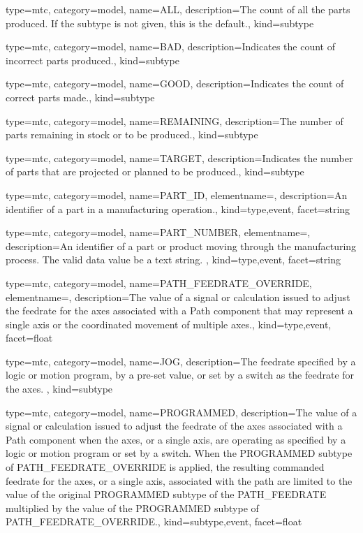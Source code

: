 {
  type=mtc,
  category=model,
  name={ALL},
  description={The count of all the parts produced.  If the subtype is not given, this is the default.},
  kind={subtype}
}


{
  type=mtc,
  category=model,
  name={BAD},
  description={Indicates the count of incorrect parts produced.},
  kind={subtype}
}


{
  type=mtc,
  category=model,
  name={GOOD},
  description={Indicates the count of correct parts made.},
  kind={subtype}
}


{
  type=mtc,
  category=model,
  name={REMAINING},
  description={The number of parts remaining in stock or to be produced.},
  kind={subtype}
}


{
  type=mtc,
  category=model,
  name={TARGET},
  description={Indicates the number of parts that are projected or planned to be produced.},
  kind={subtype}
}


{
  type=mtc,
  category=model,
  name={PART\_ID},
  elementname=,
  description={An identifier of a part in a manufacturing operation.},
  kind={type,event},
  facet={\gls{string}}
}


{
  type=mtc,
  category=model,
  name={PART\_NUMBER},
  elementname=,
  description={An identifier of a part or product moving through the manufacturing process.  The \gls{valid data value} \must be a text string. },
  kind={type,event},
  facet={\gls{string}}
}


{
  type=mtc,
  category=model,
  name={PATH\_FEEDRATE\_OVERRIDE},
  elementname=,
  description={The value of a signal or calculation issued to adjust the feedrate for the axes associated with a Path component that may represent a single axis or the coordinated movement of multiple axes.},
  kind={type,event},
  facet={\gls{float}}
}


{
  type=mtc,
  category=model,
  name={JOG},
  description={The feedrate specified by a logic or motion program, by a pre-set value, or set by a switch as the feedrate for the \gls{axes}. },
  kind={subtype}
}

{
  type=mtc,
  category=model,
  name={PROGRAMMED},
  description={The value of a signal or calculation issued to adjust the feedrate of the axes associated with a Path component when the axes, or a single axis, are operating as specified by a logic or motion program or set by a switch. \newline When the PROGRAMMED subtype of PATH\_FEEDRATE\_OVERRIDE is applied, the resulting commanded feedrate for the axes, or a single axis, associated with the path are limited to the value of the original PROGRAMMED subtype of the PATH\_FEEDRATE multiplied by the value of the PROGRAMMED subtype of PATH\_FEEDRATE\_OVERRIDE.},
  kind={subtype,event},
  facet={\gls{float}}
}



